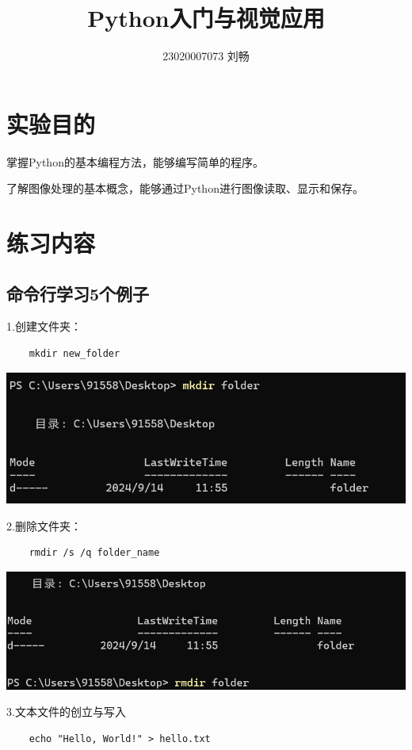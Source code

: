 \documentclass{article}
\title{Python入门与视觉应用}
\author{23020007073  刘畅}
\begin{document}
\maketitle

\section{实验目的}
掌握Python的基本编程方法，能够编写简单的程序。

了解图像处理的基本概念，能够通过Python进行图像读取、显示和保存。

\section{练习内容}

\subsection{命令行学习5个例子}
1.创建文件夹：
\begin{verbatim}
	mkdir new_folder
\end{verbatim}
\noindent
\begin{minipage}{\linewidth}
	\centering
	\includegraphics[width=0.5\linewidth]{mkdir.png}
	\label{fig:example}
\end{minipage}


2.删除文件夹：
\begin{verbatim}
	rmdir /s /q folder_name
\end{verbatim}


\noindent
\begin{minipage}{\linewidth}
	\centering
	\includegraphics[width=0.5\linewidth]{rmdir.png}
	\label{fig:example}
\end{minipage}


3.文本文件的创立与写入
\begin{verbatim}
	echo "Hello, World!" > hello.txt
\end{verbatim}
\end{document}
